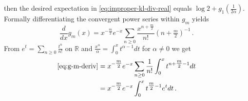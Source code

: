 \documentclass[a4paper,10pt,twocolumn]{article}
\begin{document}
then the desired expectation in \eqref{eq:improper-kl-div-real} equals $
  \log{2} + g_1(\tfrac1{2\alpha})
$.
%
%
Formally differentiating the convergent power series within $g_m$ yields
\begin{equation}  \label{eq:g-m-deriv}
  \frac{d}{d x} g_m(x)
    = x^{-\tfrac{m}2} e^{-x} \sum_{n\geq 0}
        \frac{x^{n + \tfrac{m}2}}{n!} (n + \tfrac{m}2)^{-1}
    \,.
\end{equation}
From $
    e^t  = \sum_{n\geq 0} \tfrac{t^n}{n!}
$ on $\mathbb{R}$ and $
  \tfrac{x^\alpha}{\alpha}
    = \int_0^x t^{\alpha-1} dt
$ for $\alpha\neq 0$ we get
\begin{align}  \label{eq:g-m-deriv-int-2}
  \eqref{eq:g-m-deriv}
    &= x^{-\tfrac{m}2} e^{-x} \sum_{n\geq 0}
        \frac1{n!} \int_0^x t^{n + \tfrac{m}2 - 1} dt
    \notag \\
    &= x^{-\tfrac{m}2} e^{-x}
        \int_0^x t^{\tfrac{m}2 - 1} e^t dt
    \,.
\end{align}
\end{document}
